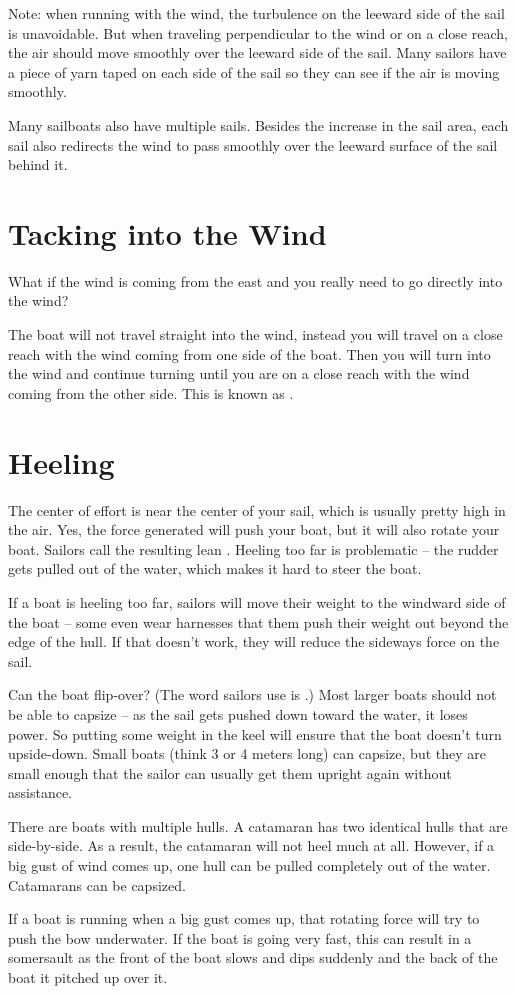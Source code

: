 Note: when running with the wind,  the turbulence on the leeward side of the sail is unavoidable.   But when traveling perpendicular to the wind or on a close reach,  the air should move smoothly over the leeward side of the sail.   Many sailors have a piece of yarn taped on each side of the sail so they can see if the air is moving smoothly.

Many sailboats also have multiple sails.  Besides the increase in the sail area,  each sail also redirects the wind to pass smoothly over the leeward surface of the sail
behind it.

\section{Tacking into the Wind}

What if the wind is coming from the east and you really need to go directly into the wind?  

The boat will not travel straight into the wind,  instead you will travel on a close reach with the wind coming from one side of the boat.   Then you will turn into the wind and continue turning
until you are on a close reach with the wind coming from the other side.  This is known as .

\section{Heeling}

The center of effort is near the center of your sail,  which is usually pretty high in the air.   Yes, the force generated will push your boat,  but it will also rotate your boat.  Sailors call
the resulting lean .    Heeling too far is problematic -- the rudder gets pulled out of the water, which makes it hard to steer the boat.

If a boat is heeling too far,  sailors will move their weight to the windward side of the boat -- some even wear harnesses that them push their weight out beyond the edge of the hull.  
If that doesn't work, they will reduce the sideways force on the sail.

Can the boat flip-over?  (The word sailors use is .)  Most larger boats should not be able to capsize -- as the sail gets pushed down toward the water,  it loses power.  So putting some weight in the keel will ensure that the boat doesn't turn upside-down.  Small boats (think 3 or 4 meters long) can capsize,  but they are small enough that the sailor can usually
get them upright again without assistance.

There are boats with multiple hulls.   A catamaran has two identical hulls that are side-by-side.  As a result,  the catamaran will not heel much at all.  However,  if a big gust of wind comes up, one hull can be pulled completely out of the water.  Catamarans can be capsized.

If a boat is running when a big gust comes up,  that rotating force will try to push the bow underwater.   If the boat is going very fast,  this can result in a somersault as 
the front of the boat slows and dips suddenly and the back of the boat it pitched up over it.


